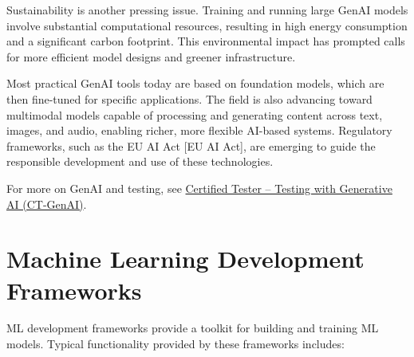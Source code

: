 \documentclass[
  letterpaper,
  DIV=11,
  numbers=noendperiod,
  oneside]{scrreprt}
\begin{document}
\begin{tcolorbox}
Sustainability is another pressing issue. Training and running large
GenAI models involve substantial computational resources, resulting in
high energy consumption and a significant carbon footprint. This
environmental impact has prompted calls for more efficient model designs
and greener infrastructure.

Most practical GenAI tools today are based on foundation models, which
are then fine-tuned for specific applications. The field is also
advancing toward multimodal models capable of processing and generating
content across text, images, and audio, enabling richer, more flexible
AI-based systems. Regulatory frameworks, such as the EU AI Act {[}EU AI
Act{]}, are emerging to guide the responsible development and use of
these technologies.

For more on GenAI and testing, see
\href{https://istqb.org/certifications/gen-ai/}{Certified Tester --
Testing with Generative AI (CT-GenAI)}.

\section{Machine Learning Development
Frameworks}\label{machine-learning-development-frameworks}

ML development framework{}s provide a toolkit for building and training
ML models. Typical functionality provided by these frameworks includes:


\end{tcolorbox}
\end{document}
